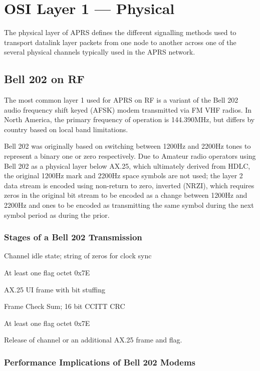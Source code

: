 \part{OSI Layer 1 --- Physical}

The physical layer of APRS defines the different signalling methods used
to transport datalink layer packets from one node to another across one of
the several physical channels typically used in the APRS network.


\chapter{Bell 202 on RF}

The most common layer 1 used for APRS on RF is a variant of the
Bell 202 audio frequency shift keyed (AFSK) modem transmitted via 
FM VHF radios. In North America, the primary frequency of operation is
144.390MHz, but differs by country based on local band limitations.

Bell 202 was originally  based on switching between 1200Hz and 2200Hz tones to
represent a binary one or zero respectively. Due to Amateur radio operators
using Bell 202 as a physical layer below AX.25, which ultimately derived 
from HDLC, the original 1200Hz mark and 2200Hz space symbols are not used;
the layer 2 data stream is encoded using 
non-return to zero, inverted (NRZI),
which requires zeros in the original bit stream to be encoded as a change
between 1200Hz and 2200Hz and ones to be encoded as transmitting the same
symbol during the next symbol period as during the prior.

\section{Stages of a Bell 202 Transmission}

Channel idle state; string of zeros for clock sync

At least one flag octet 0x7E

AX.25 UI frame with bit stuffing

Frame Check Sum; 16 bit CCITT CRC

At least one flag octet 0x7E

Release of channel or an additional AX.25 frame and flag. 

\section{Performance Implications of Bell 202 Modems}

